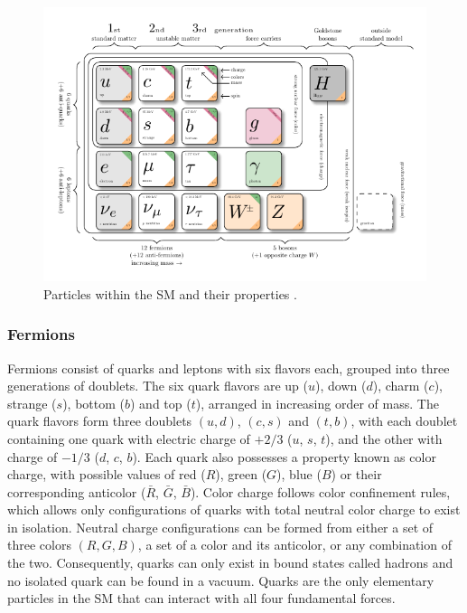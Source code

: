 \documentclass[../thesis.tex]{subfiles}
\begin{document}
\begin{figure}[!htb]
\begin{center}
\includegraphics[width=\linewidth]{fig/theory_smparticles.pdf}
\caption[Particles within the SM and their properties.]{\label{fig:smparticles}Particles within the \acs{SM} and their properties \citep{theory:smparticles}.}
\end{center}
\end{figure}

\subsubsection*{Fermions}
Fermions consist of quarks and leptons with six flavors each, grouped into three generations of doublets. The six quark flavors are up ($u$), down ($d$), charm ($c$), strange ($s$), bottom ($b$) and top ($t$), arranged in increasing order of mass. The quark flavors form three doublets $(u,d)$, $(c,s)$ and $(t,b)$, with each doublet containing one quark with electric charge of $+2/3$ ($u$, $s$, $t$), and the other with charge of $-1/3$ ($d$, $c$, $b$). Each quark also possesses a property known as color charge, with possible values of red ($R$), green ($G$), blue ($B$) or their corresponding anticolor ($\bar{R}$, $\bar{G}$, $\bar{B}$). Color charge follows color confinement rules, which allows only configurations of quarks with total neutral color charge to exist in isolation. Neutral charge configurations can be formed from either a set of three colors $(R,G,B)$, a set of a color and its anticolor, or any combination of the two. Consequently, quarks can only exist in bound states called hadrons and no isolated quark can be found in a vacuum. Quarks are the only elementary particles in the \acs{SM} that can interact with all four fundamental forces.
\end{document}
